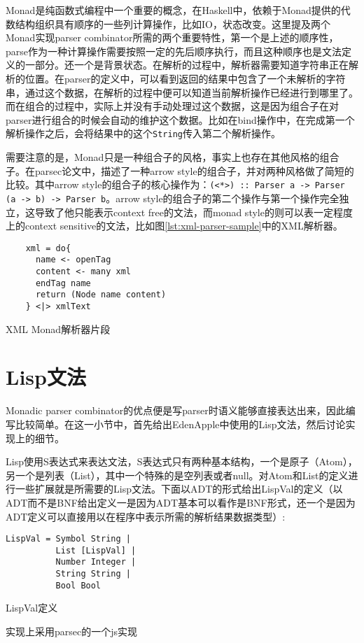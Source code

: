 Monad是纯函数式编程中一个重要的概念，在Haskell中，依赖于Monad提供的代数结构组织具有顺序的一些列计算操作，比如IO，状态改变。这里提及两个Monad实现parser combinator所需的两个重要特性，第一个是上述的顺序性，parse作为一种计算操作需要按照一定的先后顺序执行，而且这种顺序也是文法定义的一部分。还一个是背景状态。在解析的过程中，解析器需要知道字符串正在解析的位置。在parser的定义中，可以看到返回的结果中包含了一个未解析的字符串，通过这个数据，在解析的过程中便可以知道当前解析操作已经进行到哪里了。而在组合的过程中，实际上并没有手动处理过这个数据，这是因为组合子在对parser进行组合的时候会自动的维护这个数据。比如在bind操作中，在完成第一个解析操作之后，会将结果中的这个\texttt{String}传入第二个解析操作。

需要注意的是，Monad只是一种组合子的风格，事实上也存在其他风格的组合子。在parsec论文\cite{leijen01parsec}中，描述了一种arrow style的组合子，并对两种风格做了简短的比较。其中arrow style的组合子的核心操作为：\texttt{(<*>) :: Parser a -> Parser (a -> b) -> Parser b}。arrow style的组合子的第二个操作与第一个操作完全独立，这导致了他只能表示context free的文法，而monad style的则可以表一定程度上的context sensitive的文法，比如图\ref{lst:xml-parser-sample}中的XML解析器。

\begin{code}
  \begin{verbatim}
    xml = do{
      name <- openTag
      content <- many xml
      endTag name
      return (Node name content)
    } <|> xmlText
  \end{verbatim}
  \caption{XML Monad解析器片段}
  \label{lst:xml-parser-sample}
\end{code}

\section{Lisp文法}

Monadic parser combinator的优点便是写parser时语义能够直接表达出来，因此编写比较简单。在这一小节中，首先给出EdenApple中使用的Lisp文法，然后讨论实现上的细节。

Lisp使用S表达式来表达文法，S表达式只有两种基本结构，一个是原子（Atom），另一个是列表（List），其中一个特殊的是空列表或者null。对Atom和List的定义进行一些扩展就是所需要的Lisp文法。下面以ADT的形式给出LispVal的定义（以ADT而不是BNF给出定义一是因为ADT基本可以看作是BNF形式，还一个是因为ADT定义可以直接用以在程序中表示所需的解析结果数据类型）:

\begin{listing}
\begin{verbatim}
LispVal = Symbol String |
          List [LispVal] |
          Number Integer |
          String String |
          Bool Bool
\end{verbatim}
\caption{LispVal定义}
\label{lst:lisp-val-def}
\end{listing}

实现上采用parsec的一个js实现